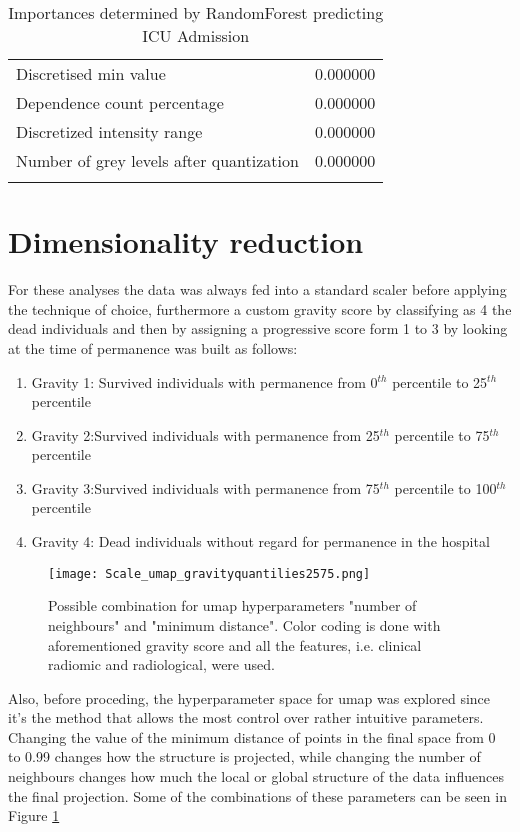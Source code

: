 \begin{longtable}{|lr|}
Discretised min value                              &        0.000000 \\
Dependence count percentage                        &        0.000000 \\
Discretized intensity range                        &        0.000000 \\
Number of grey levels after quantization           &        0.000000 \\
\bottomrule
\caption{Importances determined by RandomForest predicting ICU Admission} %
\label{tab:RFimpoRad}
\end{longtable}

\section{Dimensionality reduction}
For these analyses the data was always fed into a standard scaler before applying the technique of choice, furthermore a custom gravity score by classifying as 4 the dead individuals and then by assigning a progressive score form 1 to 3 by looking at the time of permanence was built as follows:

\begin{enumerate}
\item Gravity 1: Survived individuals with permanence from 0$^{th}$ percentile to 25$^{th}$ percentile
\item Gravity 2:Survived individuals with permanence from 25$^{th}$ percentile to 75$^{th}$ percentile
\item Gravity 3:Survived individuals with permanence from 75$^{th}$ percentile to 100$^{th}$ percentile
\item Gravity 4: Dead individuals without regard for permanence in the hospital
\end{enumerate}

\begin{figure}[htbp]
	\centering 
  		\texttt{[image: Scale\_umap\_gravityquantilies2575.png]}
        \caption{Possible combination for umap hyperparameters "number of neighbours" and "minimum distance". Color coding is done with aforementioned gravity score and all the features, i.e. clinical radiomic and radiological, were used.  \label{fig:hyperparam_umap}}
\end{figure}


Also, before proceding, the hyperparameter space for umap was explored since it's the method that allows the most control over rather intuitive parameters.
Changing the value of the minimum distance of points in the final space from 0 to 0.99 changes how the structure is projected, while changing the number of neighbours changes how much the local or global structure of the data influences the final projection.
 Some of the combinations of these parameters can be seen in Figure \ref{fig:hyperparam_umap}


